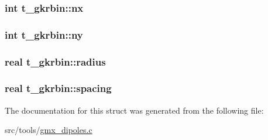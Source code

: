 \hypertarget{structt__gkrbin_aedaf7c275ea9f1077581c09caf26872e}{
\subsubsection[{nx}]{\setlength{\rightskip}{0pt plus 5cm}int {\bf t\-\_\-gkrbin\-::nx}}}\label{structt__gkrbin_aedaf7c275ea9f1077581c09caf26872e}
\hypertarget{structt__gkrbin_a7b5716fe947f4fd2f962065abc854425}{
\subsubsection[{ny}]{\setlength{\rightskip}{0pt plus 5cm}int {\bf t\-\_\-gkrbin\-::ny}}}\label{structt__gkrbin_a7b5716fe947f4fd2f962065abc854425}
\hypertarget{structt__gkrbin_af039f5b19a458e980f0918087b1bddc4}{
\subsubsection[{radius}]{\setlength{\rightskip}{0pt plus 5cm}real {\bf t\-\_\-gkrbin\-::radius}}}\label{structt__gkrbin_af039f5b19a458e980f0918087b1bddc4}
\hypertarget{structt__gkrbin_a8d537e0d1dc7513eb5bbe6f14cfb9506}{
\subsubsection[{spacing}]{\setlength{\rightskip}{0pt plus 5cm}real {\bf t\-\_\-gkrbin\-::spacing}}}\label{structt__gkrbin_a8d537e0d1dc7513eb5bbe6f14cfb9506}


\-The documentation for this struct was generated from the following file\-:\begin{DoxyCompactItemize}
\item 
src/tools/\hyperlink{gmx__dipoles_8c}{gmx\-\_\-dipoles.\-c}\end{DoxyCompactItemize}
